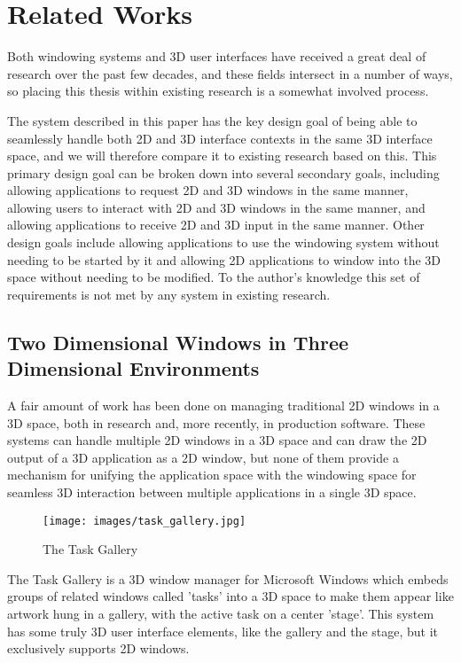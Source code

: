\chapter{Related Works}
\label{sec:related-works}

Both windowing systems and 3D user interfaces have received a great deal of research over the past few decades, and these fields intersect in a number of ways, so placing this thesis within existing research is a somewhat involved process. 

The system described in this paper has the key design goal of being able to seamlessly handle both 2D and 3D interface contexts in the same 3D interface space, and we will therefore compare it to existing research based on this. This primary design goal can be broken down into several secondary goals, including allowing applications to request 2D and 3D windows in the same manner, allowing users to interact with 2D and 3D windows in the same manner, and allowing applications to receive 2D and 3D input in the same manner. Other design goals include allowing applications to use the windowing system without needing to be started by it and allowing 2D applications to window into the 3D space without needing to be modified. To the author's knowledge this set of requirements is not met by any system in existing research.

\section{Two Dimensional Windows in Three Dimensional Environments}
A fair amount of work has been done on managing traditional 2D windows in a 3D space, both in research and, more recently, in production software. These systems can handle multiple 2D windows in a 3D space and can draw the 2D output of a 3D application as a 2D window, but none of them provide a mechanism for unifying the application space with the windowing space for seamless 3D interaction between multiple applications in a single 3D space.

\begin{figure}[ht!]
\centering
\texttt{[image: images/task\_gallery.jpg]}
\caption{The Task Gallery \protect\cite{task_gallery}}
\end{figure}

The Task Gallery \cite{task_gallery} is a 3D window manager for Microsoft Windows which embeds groups of related windows called 'tasks' into a 3D space to make them appear like artwork hung in a gallery, with the active task on a center 'stage'. This system has some truly 3D user interface elements, like the gallery and the stage, but it exclusively supports 2D windows. 

